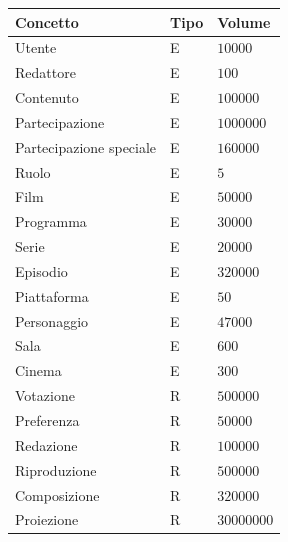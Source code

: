 \documentclass[a4paper]{article}
\begin{document}
\begin{tabular}{ | L{0.33\textwidth} | L{0.33\textwidth} | L{0.33\textwidth} | }

\hline
\textbf{Concetto} & \textbf{Tipo} & \textbf{Volume} \\

\hline
\hline
 Utente & E & $10000$ \\ 
 
\hline
 Redattore & E & $100$ \\ 
 
\hline
 Contenuto & E & $100000$ \\ 
 
\hline
 Partecipazione & E & $1000000$ \\ 
 
\hline
 Partecipazione speciale & E & $160000$ \\ 
 
\hline
 Ruolo & E & $5$ \\ 
 
\hline
 Film & E & $50000$ \\ 
 
\hline
 Programma & E & $30000$ \\ 
 
\hline
 Serie & E & $20000$ \\ 
 
\hline
 Episodio & E & $320000$ \\
 
\hline
 Piattaforma & E & $50$ \\ 
 
\hline
 Personaggio & E & $47000$ \\ 
 
\hline
 Sala & E & $600$ \\ 
 
\hline
 Cinema & E & $300$ \\ 
\hline
 Votazione & R & $500000$ \\ 

\hline
 Preferenza & R & $50000$ \\ 

\hline
 Redazione & R & $100000$ \\ 

\hline
 Riproduzione & R & $500000$ \\ 

\hline
 Composizione & R & $320000$ \\ 

\hline
 Proiezione & R & $30000000$ \\ 


\end{tabular}
\end{document}
